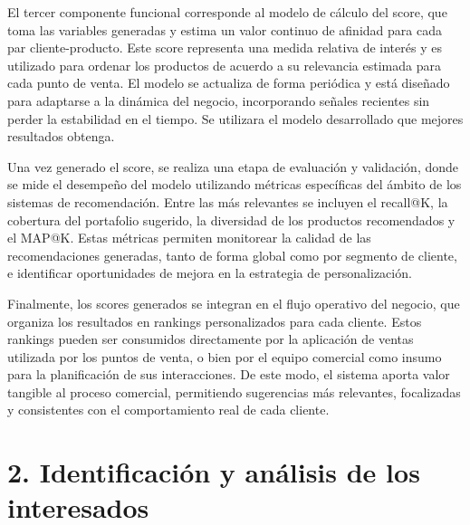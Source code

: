 \documentclass[
11pt, %
]{charter}
\begin{document}
El tercer componente funcional corresponde al modelo de cálculo del score, que toma las variables generadas y estima un valor continuo de afinidad para cada par cliente-producto. Este score representa una medida relativa de interés y es utilizado para ordenar los productos de acuerdo a su relevancia estimada para cada punto de venta. El modelo se actualiza de forma periódica y está diseñado para adaptarse a la dinámica del negocio, incorporando señales recientes sin perder la estabilidad en el tiempo. Se utilizara el modelo desarrollado que mejores resultados obtenga.

Una vez generado el score, se realiza una etapa de evaluación y validación, donde se mide el desempeño del modelo utilizando métricas específicas del ámbito de los sistemas de recomendación. Entre las más relevantes se incluyen el recall@K, la cobertura del portafolio sugerido, la diversidad de los productos recomendados y el MAP@K. Estas métricas permiten monitorear la calidad de las recomendaciones generadas, tanto de forma global como por segmento de cliente, e identificar oportunidades de mejora en la estrategia de personalización.

Finalmente, los scores generados se integran en el flujo operativo del negocio, que organiza los resultados en rankings personalizados para cada cliente. Estos rankings pueden ser consumidos directamente por la aplicación de ventas utilizada por los puntos de venta, o bien por el equipo comercial como insumo para la planificación de sus interacciones. De este modo, el sistema aporta valor tangible al proceso comercial, permitiendo sugerencias más relevantes, focalizadas y consistentes con el comportamiento real de cada cliente.

\section{2. Identificación y análisis de los interesados}
\label{sec:interesados}
\end{document}
